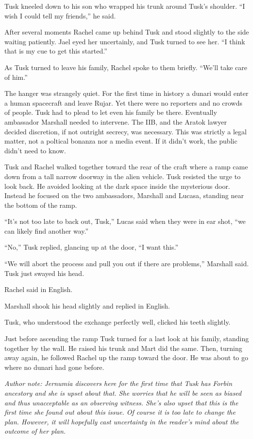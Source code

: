 Tusk kneeled down to his son who wrapped his trunk around Tusk's shoulder. ``I wish I could tell
my friends,'' he said.

After several moments Rachel came up behind Tusk and stood slightly to the side waiting
patiently. Jael eyed her uncertainly, and Tusk turned to see her. ``I think that is my cue to
get this started.''

As Tusk turned to leave his family, Rachel spoke to them briefly. ``We'll take care of him.''

The hanger was strangely quiet. For the first time in history a dunari would enter a human
spacecraft and leave Rujar. Yet there were no reporters and no crowds of people. Tusk had to
plead to let even his family be there. Eventually ambassador Marshall needed to intervene. The
IIB, and the Aratok lawyer decided discretion, if not outright secrecy, was necessary. This was
strictly a legal matter, not a poltical bonanza nor a media event. If it didn't work, the public
didn't need to know.

Tusk and Rachel walked together toward the rear of the craft where a ramp came down from a tall
narrow doorway in the alien vehicle. Tusk resisted the urge to look back. He avoided looking at
the dark space inside the mysterious door. Instead he focused on the two ambassadors, Marshall
and Lucasa, standing near the bottom of the ramp.

``It's not too late to back out, Tusk,'' Lucas said when they were in ear shot, ``we can likely
find another way.''

``No,'' Tusk replied, glancing up at the door, ``I want this.''

``We will abort the process and pull you out if there are problems,'' Marshall said. Tusk just
swayed his head.

 Rachel said in English.

Marshall shook his head slightly and replied in English. 

Tusk, who understood the exchange perfectly well, clicked his teeth slightly.

Just before ascending the ramp Tusk turned for a last look at his family, standing together by
the wall. He raised his trunk and Mart did the same. Then, turning away again, he followed
Rachel up the ramp toward the door. He was about to go where no dunari had gone before.

\textit{Author note: Jernumia discovers here for the first time that Tusk has Forbin ancestory
  and she is upset about that. She worries that he will be seen as biased and thus unacceptable
  as an observing witness. She's also upset that this is the first time she found out about this
  issue. Of course it is too late to change the plan. However, it will hopefully cast
  uncertainty in the reader's mind about the outcome of her plan.}